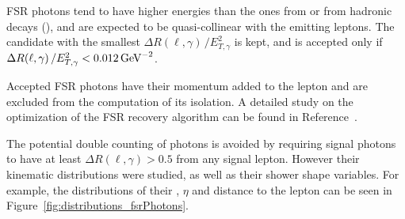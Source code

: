 FSR photons tend to have higher energies than the ones from \pileup{} or from hadronic decays (\eg \PGpz),
and are expected to be quasi-collinear with the emitting leptons.
The candidate with the smallest $\Delta R(\ell, \gamma)\, / E_{T,\gamma}^{2}$ is kept,
and is accepted only if $\Delta R(\ell, \gamma)\, / E_{T,\gamma}^{2} < 0.012 \,\text{Ge\hspace{-.08em}V}^{-2}$.

Accepted FSR photons have their momentum added to the lepton and are excluded from the computation of its isolation.
A detailed study on the optimization of the FSR recovery algorithm can be found in Reference~\cite{CMS-HIG-16-041}.

The potential double counting of photons is avoided by requiring
signal photons to have at least $\Delta R(\ell, \gamma) > 0.5$ from any signal lepton.
However their kinematic distributions were studied, as well as their shower shape variables.
For example, the distributions of their \pt, $\eta$ and distance to the lepton can be seen in Figure~\ref{fig:distributions_fsrPhotons}.

